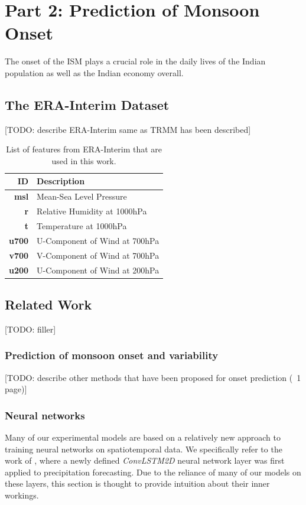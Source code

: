 \chapter{Part 2: Prediction of Monsoon Onset}
\label{c:part2}
The onset of the ISM plays a crucial role in the daily lives of the Indian population as well as the Indian economy overall.

\section{The ERA-Interim Dataset}
\label{st:era_interim}
[TODO: describe ERA-Interim same as TRMM has been described]

\begin{table}[h]
  \centering
  \begin{tabular}{rl}
    \toprule
    \textbf{ID} & \textbf{Description} \\
    \midrule
    \textbf{msl} & Mean-Sea Level Pressure \\
    \textbf{r} & Relative Humidity at 1000hPa \\
    \textbf{t} & Temperature at 1000hPa \\
    \textbf{u700} & U-Component of Wind at 700hPa \\
    \textbf{v700} & V-Component of Wind at 700hPa \\
    \textbf{u200} & U-Component of Wind at 200hPa \\
    \bottomrule
  \end{tabular}
  \caption{List of features from ERA-Interim that are used in this work.}
  \label{tab:era_features}
\end{table}

\section{Related Work}
[TODO: filler]


\subsection{Prediction of monsoon onset and variability}
\label{sst:related_prediction}
[TODO:  describe other methods that have been proposed for onset prediction (~1 page)]

\subsection{Neural networks}
\label{sst:neural_networks}
Many of our experimental models are based on a relatively new approach to training neural networks on spatiotemporal data. We specifically refer to the work of \citet{Shi.2015}, where a newly defined \textit{ConvLSTM2D} neural network layer was first applied to precipitation forecasting. Due to the reliance of many of our models on these layers, this section is thought to provide intuition about their inner workings.

